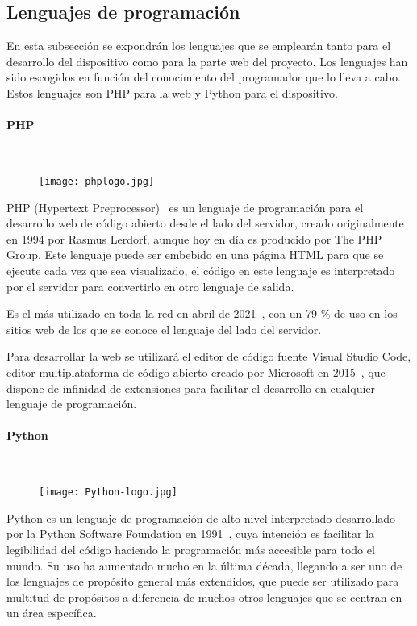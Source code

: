 \subsection{Lenguajes de programación}\label{subsec:lenguajes}
En esta subsección se expondrán los lenguajes que se emplearán tanto para el desarrollo del dispositivo como para la parte web del proyecto. Los lenguajes han sido escogidos en función del conocimiento del programador que lo lleva a cabo. Estos lenguajes son PHP para la web y Python para el dispositivo.
\pagebreak

\paragraph{PHP}\mbox{} \\
\begin{figure}[H]
	{\texttt{[image: phplogo.jpg]}}\label{fig:phpLogo}
\end{figure}
PHP (Hypertext Preprocessor)~\cite{welling_php_2003} es un lenguaje de programación para el desarrollo web de código abierto desde el lado del servidor, creado originalmente en 1994 por Rasmus Lerdorf, aunque hoy en día es producido por The PHP Group. Este lenguaje puede ser embebido en una página HTML para que se ejecute cada vez que sea visualizado, el código en este lenguaje es interpretado por el servidor para convertirlo en otro lenguaje de salida.

Es el más utilizado en toda la red en abril de 2021~\cite{noauthor_usage_nodate}, con un 79 \% de uso en los sitios web de los que se conoce el lenguaje del lado del servidor.

Para desarrollar la web se utilizará el editor de código fuente Visual Studio Code, editor multiplataforma de código abierto creado por Microsoft en 2015~\cite{noauthor_visual_2021}, que dispone de infinidad de extensiones para facilitar el desarrollo en cualquier lenguaje de programación.

\paragraph{Python}\mbox{} \\
\begin{figure}[H]
	{\texttt{[image: Python-logo.jpg]}}\label{fig:logoPython}
\end{figure}
Python es un lenguaje de programación de alto nivel interpretado desarrollado por la Python Software Foundation en 1991~\cite{montoro_python_2012}, cuya intención es facilitar la legibilidad del código haciendo la programación más accesible para todo el mundo. Su uso ha aumentado mucho en la última década, llegando a ser uno de los lenguajes de propósito general más extendidos, que puede ser utilizado para multitud de propósitos a diferencia de muchos otros lenguajes que se centran en un área específica.

